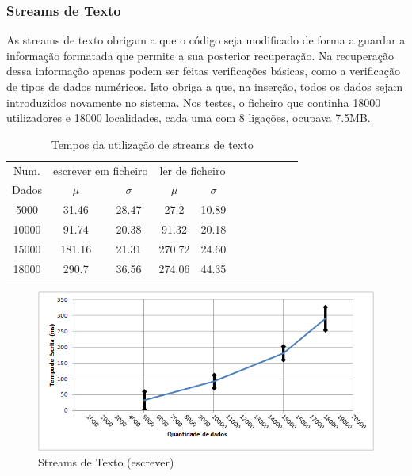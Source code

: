\documentclass[a5paper,twocolumn, 11pt]{article}
\begin{document}
\subsubsection{Streams de Texto}
As streams de texto obrigam a que o código seja modificado de forma a guardar a informação formatada que permite a sua posterior recuperação.
Na recuperação dessa informação apenas podem ser feitas verificações básicas, como a verificação de tipos de dados numéricos.
Isto obriga a que, na inserção, todos os dados sejam introduzidos novamente no sistema.
Nos testes, o ficheiro que continha 18000 utilizadores e 18000 localidades, cada uma com 8 ligações, ocupava 7.5MB.
\clearpage
\onecolumn
\begin{center}
    \begin{table}[h!b!t!]
    \begin{center}
    \caption{Tempos da utilização de streams de texto}
    \begin{tabular}[hbt]{ | *{11}{c|} }
    \hline
        Num. & \multicolumn{2}{|c|}{escrever em ficheiro} & \multicolumn{2}{|c|}{ler de ficheiro}\\ %
        Dados & $\mu$ & $\sigma$ & $\mu$ & $\sigma$\\ \hline
        5000 & 31.46 & 28.47 & 27.2 & 10.89\\ \hline
        10000 & 91.74 & 20.38 & 91.32 & 20.18\\ \hline
        15000 & 181.16 & 21.31 & 270.72 & 24.60\\ \hline
        18000 & 290.7 & 36.56 & 274.06 & 44.35\\ \hline
    \end{tabular}
\end{center}
\end{table}
\end{center}
\begin{figure}[h!b!t!]
    \caption[Streams de Texto (escrever)]{Streams de Texto (escrever)}
    \centering
        \includegraphics[width=400pt]{ef_1.png}
\end{figure}
\end{document}
